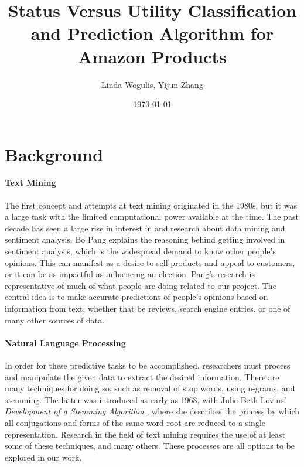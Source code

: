 \documentclass[dvips,12pt]{article}
\begin{document}

\title{\textbf{Status Versus Utility Classification and Prediction Algorithm for Amazon Products}}
\author{Linda Wogulis, Yijun Zhang}
\date{\today}



\maketitle


\section{Background}


\paragraph{Text Mining}
The first concept and attempts at text mining originated in the 1980s, but it was a large task with the limited computational power available at the time. The past decade has seen a large rise in interest in and research about data mining and sentiment analysis. Bo Pang\cite{pang2008opinion} explains the reasoning behind getting involved in sentiment analysis, which is the widespread demand to know other people's opinions. This can manifest as a desire to sell products and appeal to customers, or it can be as impactful as influencing an election. Pang's research is representative of much of what people are doing related to our project. The central idea is to make accurate predictions of people's opinions based on information from text, whether that be reviews, search engine entries, or one of many other sources of data. 

\paragraph{Natural Language Processing}
In order for these predictive tasks to be accomplished, researchers must process and manipulate the given data to extract the desired information. There are many techniques for doing so, such as removal of stop words, using n-grams, and stemming. The latter was introduced as early as 1968, with Julie Beth Lovins' \textit{Development of a Stemming Algorithm} \cite{lovins1968development}, where she describes the process by which all conjugations and forms of the same word root are reduced to a single representation. Research in the field of text mining requires the use of at least some of these techniques, and many others. These processes are all options to be explored in our work.
\end{document}
